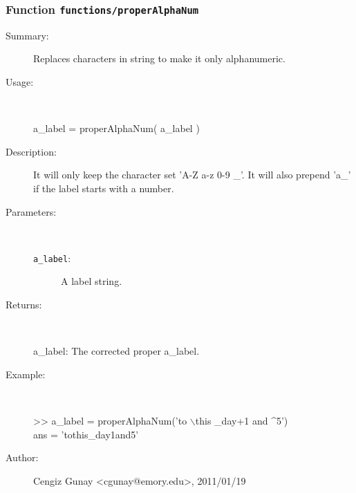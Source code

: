 \subsubsection[Function \texttt{properAlphaNum}]{Function \texttt{functions/properAlphaNum}}%
%
\label{ref_functions__properAlphaNum}%
\hypertarget{ref_functions__properAlphaNum}{}%
\begin{description}
\item[Summary:]Replaces characters in string to make it only alphanumeric.
%
\item[Usage:]~%
\begin{lyxcode}%
a\_label = properAlphaNum( a\_label )
%
\end{lyxcode}%
%
\item[Description:]%
It will only keep the character set 'A-Z a-z 0-9 \_'. It will also
 prepend 'a\_' if the label starts with a number.
\item[Parameters:]~
\begin{description}%
\item[\texttt{a\_label}:]
 A label string.
\end{description}%
%
\item[Returns:
]~

   a\_label: The corrected proper a\_label.
%
\item[Example:]~
\begin{lyxcode} >> a\_label = properAlphaNum('to $\backslash$this \_day+1 and \textasciicircum{}5')
\\%
 ans = 'tothis\_day1and5' 
\\%
\end{lyxcode}
%
%
\item[Author:]%
Cengiz Gunay <cgunay@emory.edu>, 2011/01/19
%
\end{description}
\methodline%
